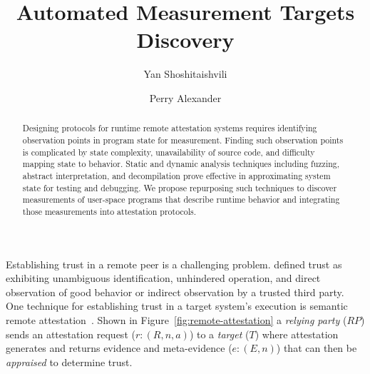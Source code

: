 \documentclass[runningheads]{llncs}
\begin{document}
%
\title{Automated Measurement Targets Discovery}
%
%
\author{Yan Shoshitaishvili \and Perry Alexander}
%
%
%
\maketitle              %
%
\begin{abstract}
  Designing protocols for runtime remote attestation systems requires
  identifying observation points in program state for measurement.
  Finding such observation points is complicated by state complexity,
  unavailability of source code, and difficulty mapping state to
  behavior.  Static and dynamic analysis techniques including fuzzing,
  abstract interpretation, and decompilation prove effective in
  approximating system state for testing and debugging.  We propose
  repurposing such techniques to discover measurements of user-space
  programs that describe runtime behavior and integrating those
  measurements into attestation protocols.
  
\end{abstract}
%
%
%


Establishing trust in a remote peer is a challenging
problem. \citet{Martin:08:The-ten-page-in} defined trust as exhibiting
unambiguous identification, unhindered operation, and direct
observation of good behavior or indirect observation by a trusted
third party. One technique for establishing
trust in a target system's execution is semantic remote
attestation~\citep{Haldar:04:Semantic-Remote,Coker::Principles-of-R}. Shown
in Figure~\ref{fig:remote-attestation} a \emph{relying party} ($RP$)
sends an attestation request ($r:(R,n,a)$) to a \emph{target} ($T$)
where attestation generates and returns evidence and meta-evidence
($e:(E,n)$) that can then be \emph{appraised} to determine trust.
\end{document}
